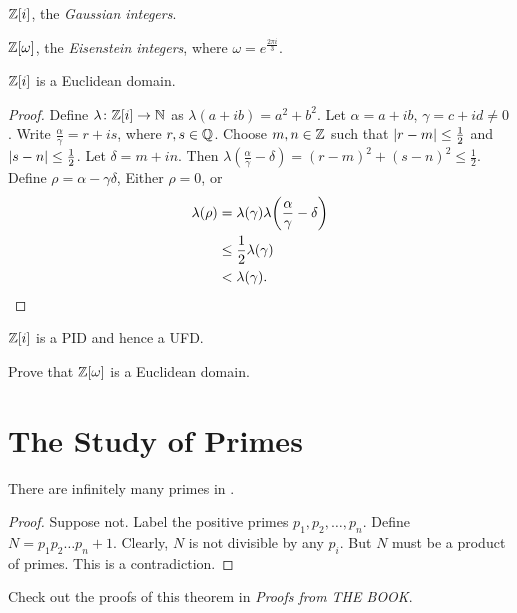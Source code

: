 \begin{examples}[UFD]
    \item $\mathbb{Z}[i]$, the \emph{Gaussian integers}.
    \item $\mathbb{Z}[\omega]$, the \emph{Eisenstein integers}, where
    $\omega = e^{\frac{2 \pi i}{3}}$.
\end{examples}
\begin{proposition}
    $\mathbb{Z}[i]$ is a Euclidean domain.
\end{proposition}
\begin{proof}
    Define $\lambda\colon \mathbb{Z}[i] \to \mathbb{N}$ as $\lambda(a + ib) = a^2 + b^2$.
    Let $\alpha = a + ib$, $\gamma = c + id \ne 0$.
    Write $\frac{\alpha}{\gamma} = r + is$, where $r, s \in \mathbb{Q}$.
    Choose $m, n \in \mathbb{Z}$ such that $\abs{r - m} \le \frac12$ and
    $\abs{s - n} \le \frac12$.
    Let $\delta = m + in$.
    Then $\lambda(\frac{\alpha}{\gamma} - \delta) = (r - m)^2 + (s - n)^2
    \le \frac12$.
    Define $\rho = \alpha - \gamma \delta$,
    Either $\rho = 0$, or \begin{align*}
        \lambda(\rho)
        &= \lambda(\gamma)
            \lambda\paren*[\bigg]{\frac{\alpha}{\gamma} - \delta} \\
        &\le \frac12 \lambda(\gamma) \\
        &< \lambda(\gamma).
    \end{align*}
\end{proof}
\begin{corollary}
    $\mathbb{Z}[i]$ is a PID and hence a UFD.
\end{corollary}

\begin{exercise}
    Prove that $\mathbb{Z}[\omega]$ is a Euclidean domain.
\end{exercise}

\chapter{The Study of Primes} \label{chp:primes}
\begin{theorem}[Euclid] \label{thm:infinitude_of_primes}
    There are infinitely many primes in \Z.
\end{theorem}
\begin{proof}
    Suppose not.
    Label the positive primes $p_1, p_2, \dots, p_n$.
    Define $N = p_1 p_2 \dots p_n + 1$.
    Clearly, $N$ is not divisible by any $p_i$.
    But $N$ must be a product of primes.
    This is a contradiction.
\end{proof}
\begin{remark}
    Check out the proofs of this theorem in \textit{Proofs from THE BOOK}.
\end{remark}

